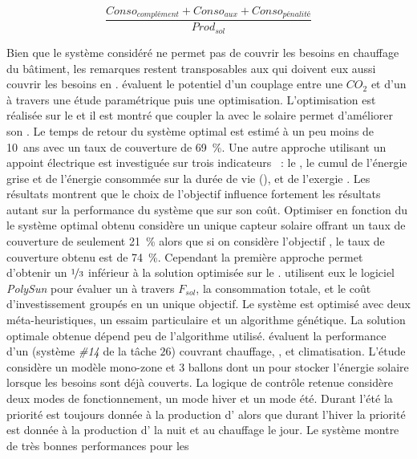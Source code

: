 \begin{equation}\label{eq:qmin_qsol}
    \frac{Conso_{complément} + Conso_{aux} + Conso_{pénalité}}{Prod_{sol}}
\end{equation}

Bien que le système considéré ne permet pas de couvrir les besoins en chauffage du
bâtiment, les remarques restent transposables aux  qui doivent eux aussi
couvrir les besoins en .
\textcite{Deng2013212} évaluent le potentiel d’un couplage entre une  $CO_{2}$ et
d’un  à travers une étude paramétrique puis une optimisation. L’optimisation est
réalisée sur le  et il est montré que coupler la  avec le
solaire permet d’améliorer son . Le temps de retour du système optimal est estimé
à un peu moins de \SI{10}{ans} avec un taux de couverture de \SI{69}{\percent}. Une autre
approche utilisant un appoint électrique est investiguée sur trois indicateurs
\parencite{Hin2012,Hin2014102}~:
le , le cumul de l’énergie grise et de l’énergie consommée sur la durée de vie
(), et de l’exergie . Les résultats montrent que le choix de l’objectif
influence fortement les résultats autant sur la performance du système que sur son coût.
Optimiser en fonction du  le système optimal obtenu considère un unique capteur
solaire offrant un taux de couverture de seulement \SI{21}{\percent} alors que si on
considère l’objectif , le taux de couverture obtenu est de \SI{74}{\percent}.
Cependant la première approche permet d’obtenir un  $\nicefrac{1}{3}$ inférieur à
la solution optimisée sur le . \textcite{Bornatico201231} utilisent eux le
logiciel \textit{PolySun} pour évaluer un  à travers $F_{sol}$, la
consommation totale, et le coût d’investissement groupés en un unique objectif. Le
système est optimisé avec deux méta-heuristiques, un essaim particulaire et un algorithme
génétique. La solution optimale obtenue dépend peu de l’algorithme utilisé.
\textcite{Asaee2014510} évaluent la performance d’un  (système \emph{\#14} de la tâche
$26$) couvrant chauffage, , et climatisation. L’étude considère un modèle
mono-zone et $3$ ballons dont un pour stocker l’énergie solaire lorsque les besoins sont déjà
couverts. La logique de contrôle retenue considère deux modes de fonctionnement, un mode
hiver et un mode été. Durant l’été la priorité est toujours donnée à la production
d’ alors que durant l’hiver la priorité est donnée à la production d’ la
nuit et au chauffage le jour. Le système montre de très bonnes performances pour les

